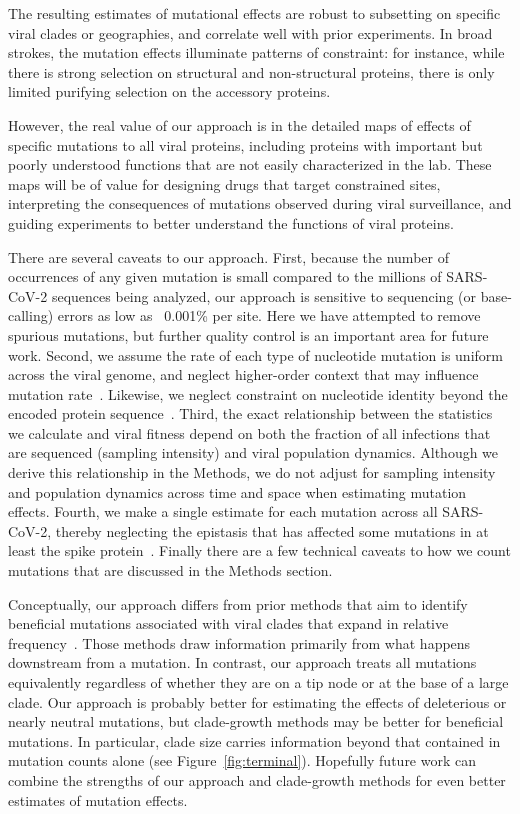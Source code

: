 \documentclass[9pt,twocolumn,twoside]{gsajnl_modified}
\begin{document}
The resulting estimates of mutational effects are robust to subsetting on specific viral clades or geographies, and correlate well with prior experiments.
In broad strokes, the mutation effects illuminate patterns of constraint: for instance, while there is strong selection on structural and non-structural proteins, there is only limited purifying selection on the accessory proteins.

However, the real value of our approach is in the detailed maps of effects of specific mutations to all viral proteins, including proteins with important but poorly understood functions that are not easily characterized in the lab.
These maps will be of value for designing drugs that target constrained sites, interpreting the consequences of mutations observed during viral surveillance, and guiding experiments to better understand the functions of viral proteins.

There are several caveats to our approach.
First, because the number of occurrences of any given mutation is small compared to the millions of SARS-CoV-2 sequences being analyzed, our approach is sensitive to sequencing (or base-calling) errors as low as ~0.001\% per site.
Here we have attempted to remove spurious mutations, but further quality control is an important area for future work.
Second, we assume the rate of each type of nucleotide mutation is uniform across the viral genome, and neglect higher-order context that may influence mutation rate~\citep{sadykov2021short,beale2004comparison}.
Likewise, we neglect constraint on nucleotide identity beyond the encoded protein sequence~\citep{huston2021comprehensive,kuo2013functional}. 
Third, the exact relationship between the statistics we calculate and viral fitness depend on both the fraction of all infections that are sequenced (sampling intensity) and viral population dynamics.
Although we derive this relationship in the Methods, we do not adjust for sampling intensity and population dynamics across time and space when estimating mutation effects.
Fourth, we make a single estimate for each mutation across all SARS-CoV-2, thereby neglecting the epistasis that has affected some mutations in at least the spike protein~\citep{starr2022shifting,moulana2022compensatory}.
Finally there are a few technical caveats to how we count mutations that are discussed in the Methods section.

Conceptually, our approach differs from prior methods that aim to identify beneficial mutations associated with viral clades that expand in relative frequency~\citep{obermeyer2022analysis,lee2022inferring,maher2022predicting}.
Those methods draw information primarily from what happens downstream from a mutation.
In contrast, our approach treats all mutations equivalently regardless of whether they are on a tip node or at the base of a large clade.
Our approach is probably better for estimating the effects of deleterious or nearly neutral mutations, but clade-growth methods may be better for beneficial mutations.
In particular, clade size carries information beyond that contained in mutation counts alone (see Figure~\ref{fig:terminal}).
Hopefully future work can combine the strengths of our approach and clade-growth methods for even better estimates of mutation effects.
\end{document}
